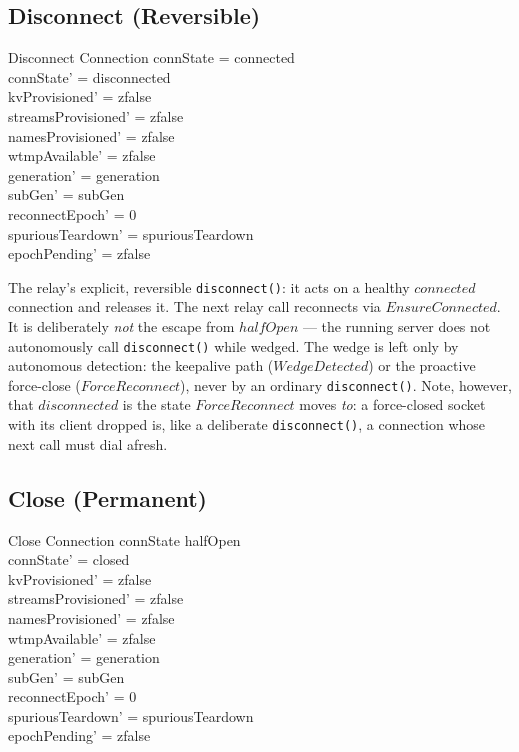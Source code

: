\documentclass[a4paper,10pt,fleqn]{article}
\begin{document}
\subsection{Disconnect (Reversible)}

\begin{schema}{Disconnect}
  \Delta Connection
  \where
  connState = connected \\
  connState' = disconnected \\
  kvProvisioned' = zfalse \\
  streamsProvisioned' = zfalse \\
  namesProvisioned' = zfalse \\
  wtmpAvailable' = zfalse \\
  generation' = generation \\
  subGen' = subGen \\
  reconnectEpoch' = 0 \\
  spuriousTeardown' = spuriousTeardown \\
  epochPending' = zfalse
\end{schema}

The relay's explicit, reversible \texttt{disconnect()}: it acts
on a healthy $connected$ connection and releases it.  The next
relay call reconnects via $EnsureConnected$.  It is deliberately
\emph{not} the escape from $halfOpen$ --- the running server does
not autonomously call \texttt{disconnect()} while wedged.  The
wedge is left only by autonomous detection: the keepalive path
($WedgeDetected$) or the proactive force-close ($ForceReconnect$),
never by an ordinary \texttt{disconnect()}.  Note, however, that
$disconnected$ is the state $ForceReconnect$ moves \emph{to}: a
force-closed socket with its client dropped is, like a deliberate
\texttt{disconnect()}, a connection whose next call must dial
afresh.

\subsection{Close (Permanent)}

\begin{schema}{Close}
  \Delta Connection
  \where
  connState \neq halfOpen \\
  connState' = closed \\
  kvProvisioned' = zfalse \\
  streamsProvisioned' = zfalse \\
  namesProvisioned' = zfalse \\
  wtmpAvailable' = zfalse \\
  generation' = generation \\
  subGen' = subGen \\
  reconnectEpoch' = 0 \\
  spuriousTeardown' = spuriousTeardown \\
  epochPending' = zfalse
\end{schema}
\end{document}

